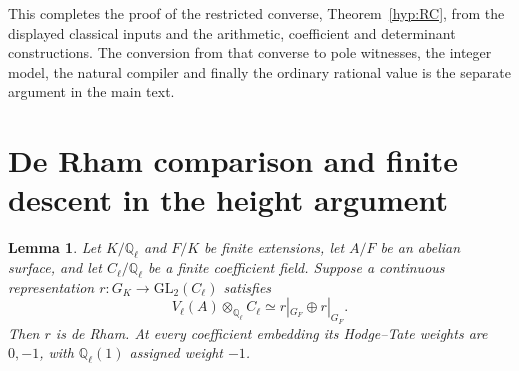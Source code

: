 \documentclass[11pt]{article}
\newtheorem{lemma}[theorem]{Lemma}
\theoremstyle{definition}
\theoremstyle{remark}
\begin{document}
This completes the proof of the restricted converse,
Theorem~\ref{hyp:RC}, from the displayed classical inputs and
the arithmetic, coefficient and determinant constructions.
The conversion from that converse to pole witnesses, the integer
model, the natural compiler and finally the ordinary rational value
is the separate argument in the main text.



\section{De Rham comparison and finite descent in the height argument}
\label{app:de-rham-descent}

\begin{lemma}\label{lem:de-rham-descent}
Let $K/\mathbb Q_\ell$ and $F/K$ be finite extensions, let $A/F$
be an abelian surface, and let $C_\ell/\mathbb Q_\ell$ be a finite
coefficient field. Suppose a continuous representation
$r:G_K\longrightarrow\mathrm{GL}_2(C_\ell)$ satisfies
\[
 V_\ell(A)\otimes_{\mathbb Q_\ell}C_\ell
       \simeq r|_{G_F}\oplus r|_{G_F}.
\]
Then $r$ is de Rham. At every coefficient embedding its
Hodge--Tate weights are $0,-1$, with
$\mathbb Q_\ell(1)$ assigned weight $-1$.
\end{lemma}
\end{document}
